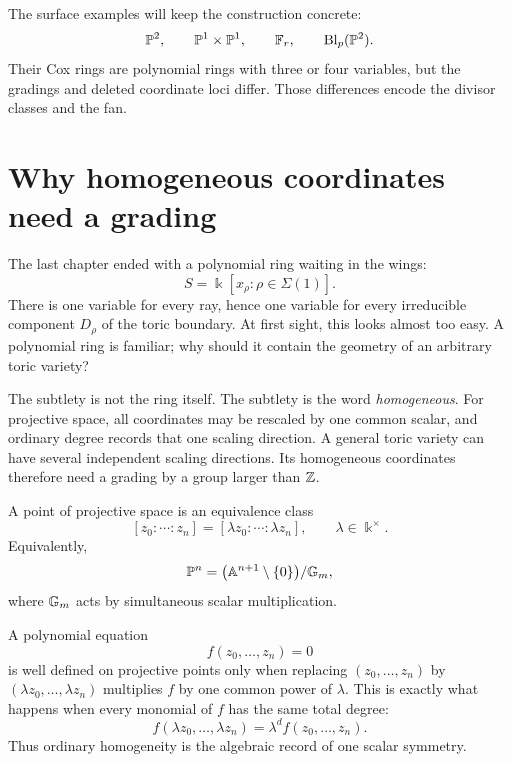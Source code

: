 \begin{surfacelaboratory}
The surface examples will keep the construction concrete:
\[
\PP^2,
\qquad
\PP^1\times\PP^1,
\qquad
\mathbb F_r,
\qquad
\Blp{\PP^2}{p}.
\]
Their Cox rings are polynomial rings with three or four variables, but
the gradings and deleted coordinate loci differ. Those differences
encode the divisor classes and the fan.
\end{surfacelaboratory}

\section{Why homogeneous coordinates need a grading}
\label{sec:why-homogeneous-coordinates-need-grading}

The last chapter ended with a polynomial ring waiting in the wings:
\[
S=\Bbbk[x_\rho:\rho\in\Sigma(1)].
\]
There is one variable for every ray, hence one variable for every
irreducible component \(D_\rho\) of the toric boundary. At first sight,
this looks almost too easy. A polynomial ring is familiar; why should
it contain the geometry of an arbitrary toric variety?

The subtlety is not the ring itself. The subtlety is the word
\emph{homogeneous}. For projective space, all coordinates may be
rescaled by one common scalar, and ordinary degree records that one
scaling direction. A general toric variety can have several
independent scaling directions. Its homogeneous coordinates therefore
need a grading by a group larger than \(\ZZ\).

\begin{agcheatsheet}
A point of projective space is an equivalence class
\[
[z_0:\cdots:z_n]
=
[\lambda z_0:\cdots:\lambda z_n],
\qquad \lambda\in\Bbbk^\times.
\]
Equivalently,
\[
\PP^n
=
\bigl(\AAA^{n+1}\setminus\{0\}\bigr)/\Gm,
\]
where \(\Gm\) acts by simultaneous scalar multiplication.

A polynomial equation
\[
f(z_0,\dots,z_n)=0
\]
is well defined on projective points only when replacing
\((z_0,\dots,z_n)\) by \((\lambda z_0,\dots,\lambda z_n)\) multiplies
\(f\) by one common power of \(\lambda\). This is exactly what happens
when every monomial of \(f\) has the same total degree:
\[
f(\lambda z_0,\dots,\lambda z_n)
=
\lambda^d f(z_0,\dots,z_n).
\]
Thus ordinary homogeneity is the algebraic record of one scalar
symmetry.
\end{agcheatsheet}

